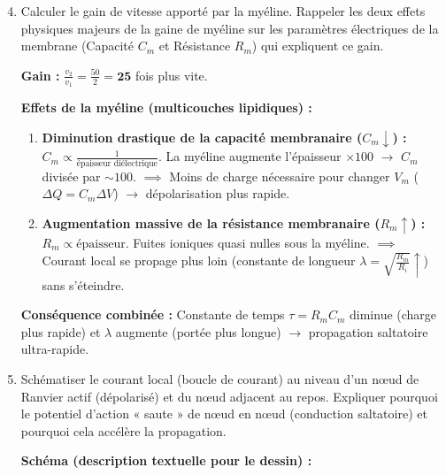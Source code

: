 \documentclass[11pt]{article}
\begin{document}
\begin{exercice}
\begin{enumerate}
\setcounter{enumi}{3}
\item Calculer le gain de vitesse apporté par la myéline. Rappeler les deux effets physiques majeurs de la gaine de myéline sur les paramètres électriques de la membrane (Capacité $C_m$ et Résistance $R_m$) qui expliquent ce gain.
\par \textbf{Gain :} $\frac{v_2}{v_1} = \frac{50}{2} = \mathbf{25}$ fois plus vite.
\par \textbf{Effets de la myéline (multicouches lipidiques) :}
\begin{enumerate}
\item \textbf{Diminution drastique de la capacité membranaire ($C_m \downarrow$) :} $C_m \propto \frac{1}{\text{épaisseur diélectrique}}$. La myéline augmente l'épaisseur $\times 100$ $\to$ $C_m$ divisée par $\sim 100$. $\implies$ Moins de charge nécessaire pour changer $V_m$ ($\Delta Q = C_m \Delta V$) $\to$ dépolarisation plus rapide.
\item \textbf{Augmentation massive de la résistance membranaire ($R_m \uparrow$) :} $R_m \propto \text{épaisseur}$. Fuites ioniques quasi nulles sous la myéline. $\implies$ Courant local se propage plus loin (constante de longueur $\lambda = \sqrt{\frac{R_m}{R_i}} \uparrow$) sans s'éteindre.
\end{enumerate}
\par \textbf{Conséquence combinée :} Constante de temps $\tau = R_m C_m$ diminue (charge plus rapide) et $\lambda$ augmente (portée plus longue) $\to$ propagation saltatoire ultra-rapide.
\item Schématiser le courant local (boucle de courant) au niveau d'un nœud de Ranvier actif (dépolarisé) et du nœud adjacent au repos. Expliquer pourquoi le potentiel d'action « saute » de nœud en nœud (conduction saltatoire) et pourquoi cela accélère la propagation.
\par \textbf{Schéma (description textuelle pour le dessin) :}
\begin{center}
\end{center}
\end{enumerate}
\end{exercice}
\end{document}
